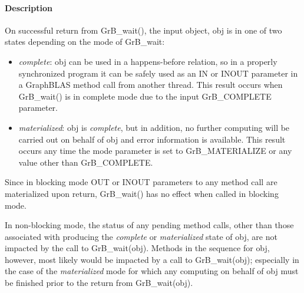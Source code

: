\paragraph{Description}

On successful return from {\sf GrB\_wait()}, the input object, {\sf obj} is in one of two states depending on the mode of {GrB\_wait}: 
\begin{itemize}
\item \emph{complete}:  {\sf obj} can be used in a happens-before relation, so in a properly synchronized
program it can be safely used as an {\sf IN} or {\sf INOUT} parameter in a
GraphBLAS method call from another thread.  This result occurs when {GrB\_wait()} is in complete mode
due to the input {GrB\_COMPLETE} parameter.

\item \emph{materialized}:  {\sf obj} is \emph{complete}, but in addition, no further computing will be 
carried out on behalf of {\sf obj} and error information is available.   This result
occurs any time the mode parameter is set to {\sf GrB\_MATERIALIZE} or any value other than
{GrB\_COMPLETE}.
\end{itemize} 
Since in blocking mode {\sf OUT} or {\sf INOUT} parameters to any method call
are materialized upon return, {\sf GrB\_wait()} has no effect when called in blocking mode. 

In non-blocking mode, the status of any pending method calls, other than those associated with producing the
\emph{complete} or \emph{materialized} state of {\sf obj}, are not impacted by the call to {\sf GrB\_wait(obj)}.
Methods in the sequence for {\sf obj}, however, most likely would be impacted by a call to
{\sf GrB\_wait(obj)}; especially in the case of the \emph{materialized} mode for which any computing 
on behalf of {\sf obj} must be finished prior to the return from {\sf GrB\_wait(obj)}.  



